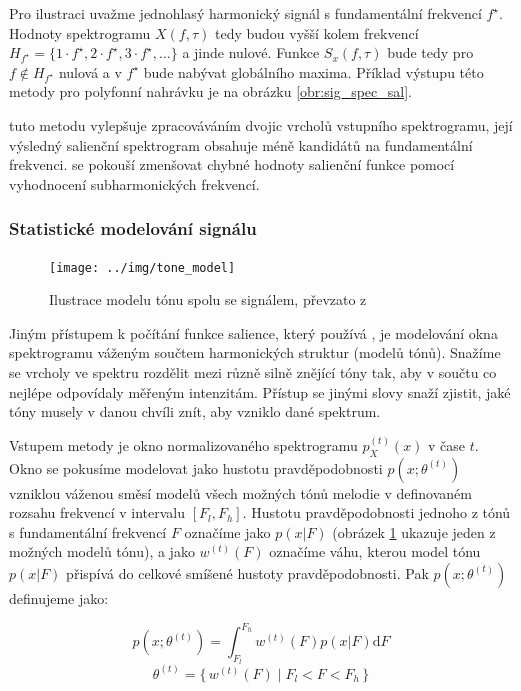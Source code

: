 Pro ilustraci uvažme jednohlasý harmonický signál s fundamentální frekvencí $f^\star$. Hodnoty spektrogramu $X(f, \tau)$ tedy budou vyšší kolem frekvencí $H_{f^\star} = \{1\cdot f^\star, 2\cdot f^\star, 3\cdot f^\star, \dots\}$ a jinde nulové. Funkce $S_x(f, \tau)$ bude tedy pro $f \not\in H_{f^\star}$ nulová a v $f^\star$ bude nabývat globálního maxima. Příklad výstupu této metody pro polyfonní nahrávku je na obrázku \ref{obr:sig_spec_sal}.

\cite{Dressler2011} tuto metodu vylepšuje zpracováváním dvojic vrcholů vstupního spektrogramu, její výsledný salienční spektrogram obsahuje méně kandidátů na fundamentální frekvenci. \cite{Cancela2008} se pokouší zmenšovat chybné hodnoty salienční funkce pomocí vyhodnocení subharmonických frekvencí.

\subsubsection{Statistické modelování signálu}

\begin{figure}[h]\centering
    \texttt{[image: ../img/tone\_model]}
\caption{Ilustrace modelu tónu spolu se signálem, převzato z \cite{Marolt2004}}\label{obr:tone_model}
\end{figure}

Jiným přístupem k počítání funkce salience, který používá \cite{Goto1999}, je modelování okna spektrogramu váženým součtem harmonických struktur (modelů tónů). Snažíme se vrcholy ve spektru rozdělit mezi různě silně znějící tóny tak, aby v součtu co nejlépe odpovídaly měřeným intenzitám. Přístup se jinými slovy snaží zjistit, jaké tóny musely v danou chvíli znít, aby vzniklo dané spektrum. 

Vstupem metody je okno normalizovaného spektrogramu $p_X^{(t)}(x)$ v čase $t$. Okno se pokusíme modelovat jako hustotu pravděpodobnosti $p(x; \theta^{(t)})$ vzniklou váženou směsí modelů všech možných tónů melodie v definovaném rozsahu frekvencí v intervalu $[F_l, F_h]$. Hustotu pravděpodobnosti jednoho z tónů s fundamentální frekvencí $F$ označíme jako $p(x|F)$ (obrázek \ref{obr:tone_model} ukazuje jeden z možných modelů tónu), a jako $w^{(t)}(F)$ označíme váhu, kterou model tónu $p(x|F)$ přispívá do celkové smíšené hustoty pravděpodobnosti. Pak $p(x; \theta^{(t)})$ definujeme jako:

$$p(x; \theta^{(t)}) = \int_{F_l}^{F_h}{w^{(t)}(F)p(x|F) \mathrm{d}F}$$
$$\theta^{(t)} = \{\, w^{(t)}(F) \mid F_l < F < F_h \,\}$$

